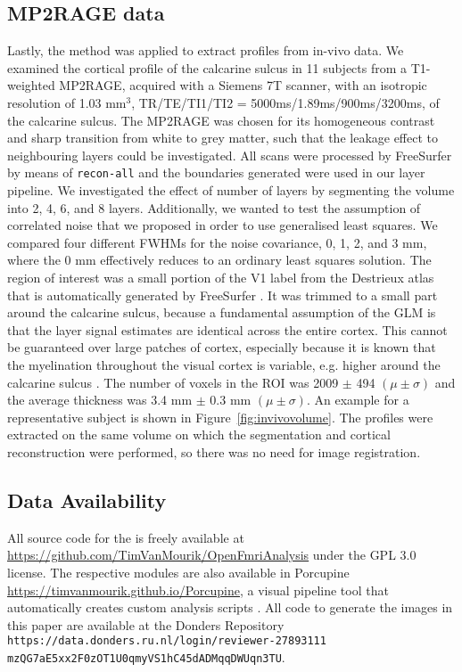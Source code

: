 \subsection{MP2RAGE data}
Lastly, the method was applied to extract profiles from in-vivo data. We examined the cortical profile of the calcarine sulcus in 11 subjects from a T1-weighted MP2RAGE, acquired with a Siemens 7T scanner, with an isotropic resolution of 1.03 mm$^3$, TR/TE/TI1/TI2 = 5000ms/1.89ms/900ms/3200ms, of the calcarine sulcus. The MP2RAGE was chosen for its homogeneous contrast and sharp transition from white to grey matter, such that the leakage effect to neighbouring layers could be investigated. All scans were processed by FreeSurfer \cite{Dale1999} by means of \texttt{recon-all} and the boundaries generated were used in our layer pipeline. We investigated the effect of number of layers by segmenting the volume into 2, 4, 6, and 8 layers. Additionally, we wanted to test the assumption of correlated noise that we proposed in order to use generalised least squares. We compared four different FWHMs for the noise covariance, 0, 1, 2, and 3 mm, where the 0 mm effectively reduces to an ordinary least squares solution. The region of interest was a small portion of the V1 label from the Destrieux atlas that is automatically generated by FreeSurfer \cite{Fischl2004}. It was trimmed to a small part around the calcarine sulcus, because a fundamental assumption of the GLM is that the layer signal estimates are identical across the entire cortex. This cannot be guaranteed over large patches of cortex, especially because it is known that the myelination throughout the visual cortex is variable, e.g. higher around the calcarine sulcus \cite{Bridge2005}. The number of voxels in the ROI was 2009 $\pm$ 494 $(\mu \pm \sigma)$ and the average thickness was 3.4 mm $\pm$ 0.3 mm $(\mu \pm \sigma)$. An example for a representative subject is shown in Figure~\ref{fig:invivovolume}. The profiles were extracted on the same volume on which the segmentation and cortical reconstruction were performed, so there was no need for image registration.


\subsection*{Data Availability}
All source code for the  is freely available at \url{https://github.com/TimVanMourik/OpenFmriAnalysis} under the GPL 3.0 license. The respective modules are also available in Porcupine \url{https://timvanmourik.github.io/Porcupine}, a visual pipeline tool that automatically creates custom analysis scripts \cite{VanMourik2017}. All code to generate the images in this paper are available at the Donders Repository \texttt{https://data.donders.ru.nl/login/reviewer-27893111 \\ mzQG7aE5xx2F0zOT1U0qmyVS1hC45dADMqqDWUqn3TU}.

